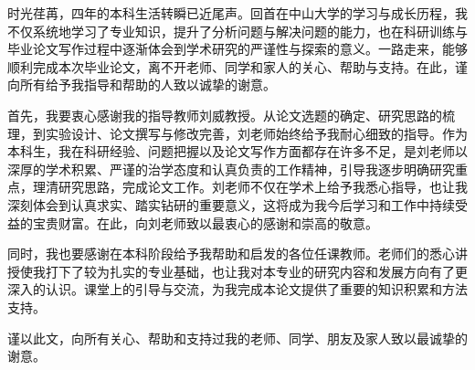 
\begin{acknowledgements}

    时光荏苒，四年的本科生活转瞬已近尾声。回首在中山大学的学习与成长历程，我不仅系统地学习了专业知识，提升了分析问题与解决问题的能力，也在科研训练与毕业论文写作过程中逐渐体会到学术研究的严谨性与探索的意义。一路走来，能够顺利完成本次毕业论文，离不开老师、同学和家人的关心、帮助与支持。在此，谨向所有给予我指导和帮助的人致以诚挚的谢意。

    首先，我要衷心感谢我的指导教师刘威教授。从论文选题的确定、研究思路的梳理，到实验设计、论文撰写与修改完善，刘老师始终给予我耐心细致的指导。作为本科生，我在科研经验、问题把握以及论文写作方面都存在许多不足，是刘老师以深厚的学术积累、严谨的治学态度和认真负责的工作精神，引导我逐步明确研究重点，理清研究思路，完成论文工作。刘老师不仅在学术上给予我悉心指导，也让我深刻体会到认真求实、踏实钻研的重要意义，这将成为我今后学习和工作中持续受益的宝贵财富。在此，向刘老师致以最衷心的感谢和崇高的敬意。

    同时，我也要感谢在本科阶段给予我帮助和启发的各位任课教师。老师们的悉心讲授使我打下了较为扎实的专业基础，也让我对本专业的研究内容和发展方向有了更深入的认识。课堂上的引导与交流，为我完成本论文提供了重要的知识积累和方法支持。

    谨以此文，向所有关心、帮助和支持过我的老师、同学、朋友及家人致以最诚挚的谢意。
    
\end{acknowledgements}
